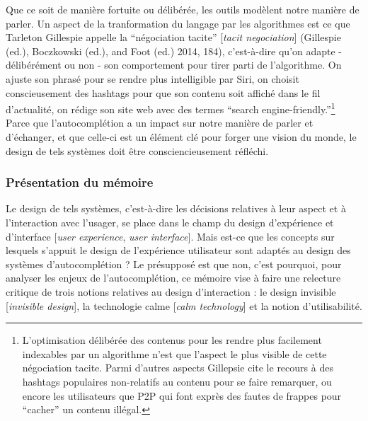 \documentclass[]{article}
\begin{document}
Que ce soit de manière fortuite ou délibérée, les outils modèlent notre
manière de parler. Un aspect de la tranformation du langage par les
algorithmes est ce que Tarleton Gillespie appelle la ``négociation
tacite'' {[}\emph{tacit negociation}{]} (Gillespie (ed.), Boczkowski
(ed.), and Foot (ed.) 2014, 184), c'est-à-dire qu'on adapte -
délibérément ou non - son comportement pour tirer parti de l'algorithme.
On ajuste son phrasé pour se rendre plus intelligible par Siri, on
choisit conscieusement des hashtags pour que son contenu soit affiché
dans le fil d'actualité, on rédige son site web avec des termes ``search
engine-friendly.''\footnote{L'optimisation délibérée des contenus pour
  les rendre plus facilement indexables par un algorithme n'est que
  l'aspect le plus visible de cette négociation tacite. Parmi d'autres
  aspects Gillepsie cite le recours à des hashtags populaires
  non-relatifs au contenu pour se faire remarquer, ou encore les
  utilisateurs que P2P qui font exprès des fautes de frappes pour
  ``cacher'' un contenu illégal.}\\
Parce que l'autocomplétion a un impact sur notre manière de parler et
d'échanger, et que celle-ci est un élément clé pour forger une vision du
monde, le design de tels systèmes doit être consciencieusement réfléchi.

\hypertarget{pruxe9sentation-du-muxe9moire}{%
\subsubsection{Présentation du
mémoire}\label{pruxe9sentation-du-muxe9moire}}

Le design de tels systèmes, c'est-à-dire les décisions relatives à leur
aspect et à l'interaction avec l'usager, se place dans le champ du
design d'expérience et d'interface {[}\emph{user experience}, \emph{user
interface}{]}. Mais est-ce que les concepts sur lesquels s'appuit le
design de l'expérience utilisateur sont adaptés au design des systèmes
d'autocomplétion ? Le présupposé est que non, c'est pourquoi, pour
analyser les enjeux de l'autocomplétion, ce mémoire vise à faire une
relecture critique de trois notions relatives au design d'interaction :
le design invisible {[}\emph{invisible design}{]}, la technologie calme
{[}\emph{calm technology}{]} et la notion d'utilisabilité.
\end{document}
